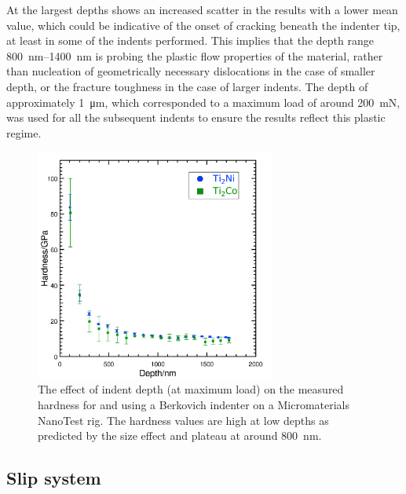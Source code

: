 At the largest depths  shows an increased scatter in the results with a lower mean value, which could be indicative of the onset of cracking beneath the indenter tip, at least in some of the indents performed. This implies that the depth range \SIrange{800}{1400}{\nano\meter} is probing the plastic flow properties of the material, rather than nucleation of geometrically necessary dislocations in the case of smaller depth, or the fracture toughness in the case of larger indents. The depth of approximately \SI{1}{\micro\meter}, which corresponded to a maximum load of around \SI{200}{\milli\newton}, was used for all the subsequent indents to ensure the results reflect this plastic regime.


\begin{figure}[h!tb]
\centering
\includegraphics[width=0.7\textwidth]{Depth_vs_Hardness_Ti2Ni}
\captionsetup{width=0.8\textwidth}
\caption[The size effect on indentation in ]{The effect of indent depth (at maximum load) on the measured hardness for  and  using a Berkovich indenter on a Micromaterials NanoTest rig. The hardness values are high at low depths as predicted by the size effect \cite{Cripps2011} and plateau at around \SI{800}{\nano\meter}.\label{fig:Depth_vs_hardness_Ti2Ni}}
\end{figure}















\subsection{Slip system}





